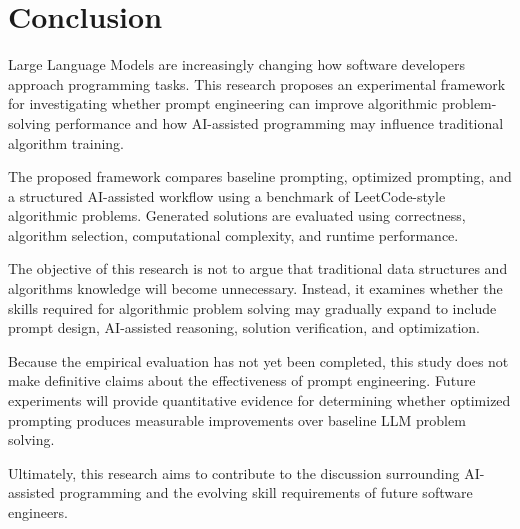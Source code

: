 \documentclass[11pt,a4paper]{article}
\begin{document}
\section{Conclusion}

Large Language Models are increasingly changing how software developers
approach programming tasks. This research proposes an experimental framework
for investigating whether prompt engineering can improve algorithmic
problem-solving performance and how AI-assisted programming may influence
traditional algorithm training.

The proposed framework compares baseline prompting, optimized prompting, and
a structured AI-assisted workflow using a benchmark of LeetCode-style
algorithmic problems. Generated solutions are evaluated using correctness,
algorithm selection, computational complexity, and runtime performance.

The objective of this research is not to argue that traditional data
structures and algorithms knowledge will become unnecessary. Instead, it
examines whether the skills required for algorithmic problem solving may
gradually expand to include prompt design, AI-assisted reasoning, solution
verification, and optimization.

Because the empirical evaluation has not yet been completed, this study does
not make definitive claims about the effectiveness of prompt engineering.
Future experiments will provide quantitative evidence for determining whether
optimized prompting produces measurable improvements over baseline LLM
problem solving.

Ultimately, this research aims to contribute to the discussion surrounding
AI-assisted programming and the evolving skill requirements of future
software engineers.




\end{document}
